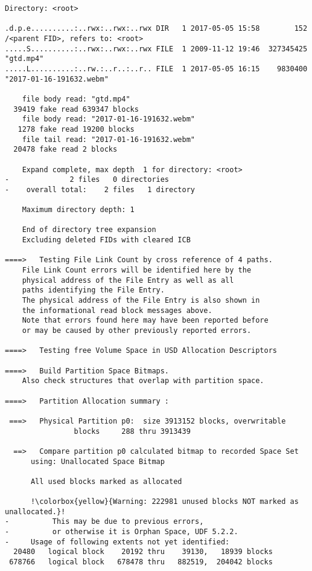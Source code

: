 \begin{lstlisting}
Directory: <root>

.d.p.e..........:..rwx:..rwx:..rwx DIR   1 2017-05-05 15:58        152 /<parent FID>, refers to: <root>
.....S..........:..rwx:..rwx:..rwx FILE  1 2009-11-12 19:46  327345425 "gtd.mp4"
.....L..........:..rw.:..r..:..r.. FILE  1 2017-05-05 16:15    9830400 "2017-01-16-191632.webm"

    file body read: "gtd.mp4"
  39419 fake read 639347 blocks
    file body read: "2017-01-16-191632.webm"
   1278 fake read 19200 blocks
    file tail read: "2017-01-16-191632.webm"
  20478 fake read 2 blocks

    Expand complete, max depth  1 for directory: <root>
-              2 files   0 directories
-    overall total:    2 files   1 directory  

    Maximum directory depth: 1

    End of directory tree expansion
    Excluding deleted FIDs with cleared ICB

====>   Testing File Link Count by cross reference of 4 paths.
    File Link Count errors will be identified here by the
    physical address of the File Entry as well as all
    paths identifying the File Entry.
    The physical address of the File Entry is also shown in
    the informational read block messages above.
    Note that errors found here may have been reported before
    or may be caused by other previously reported errors.

====>   Testing free Volume Space in USD Allocation Descriptors

====>   Build Partition Space Bitmaps.
    Also check structures that overlap with partition space.

====>   Partition Allocation summary :

 ===>   Physical Partition p0:  size 3913152 blocks, overwritable
                blocks     288 thru 3913439

  ==>   Compare partition p0 calculated bitmap to recorded Space Set
      using: Unallocated Space Bitmap

      All used blocks marked as allocated

      !\colorbox{yellow}{Warning: 222981 unused blocks NOT marked as unallocated.}!
-          This may be due to previous errors,
-          or otherwise it is Orphan Space, UDF 5.2.2.
-     Usage of following extents not yet identified:
  20480   logical block    20192 thru    39130,   18939 blocks
 678766   logical block   678478 thru   882519,  204042 blocks


\end{lstlisting}
